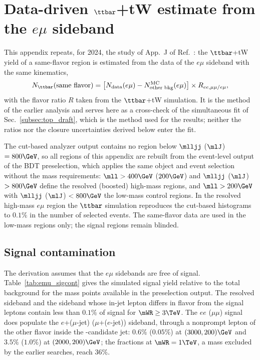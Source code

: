 \section{Data-driven \texorpdfstring{$\ttbar$+tW}{ttbar+tW} estimate from the \texorpdfstring{$e\mu$}{e-mu} sideband}
\label{app:emu_method}

This appendix repeats, for 2024, the study of App.~J of Ref.~\cite{bib:AN19083}:
the $\ttbar$+tW yield of a same-flavor region is estimated from the data of the
$e\mu$ sideband with the same kinematics,
%
\begin{equation}
  N_{\ttbar}(\text{same flavor}) =
  \bigl[N_{\text{data}}(e\mu) - N_{\text{other bkg}}^{\text{MC}}(e\mu)\bigr]
  \times R_{ee,\mu\mu/e\mu},
  \label{eq:emu_method}
\end{equation}
%
with the flavor ratio $R$ taken from the $\ttbar$+tW simulation. It is the
method of the earlier analysis and serves here as a cross-check of the
simultaneous fit of Sec.~\ref{subsec:top_draft}, which is the method used for
the results; neither the ratios nor the closure uncertainties derived below
enter the fit.

The cut-based analyzer output contains no region below $\mlljj$ ($\mlJ$)
$= 800\GeV$, so all regions of this appendix are rebuilt from the event-level
output of the BDT preselection, which applies the same object and event
selection without the mass requirements: $\mll > 400\GeV$ ($200\GeV$) and
$\mlljj$ ($\mlJ$) $> 800\GeV$ define the resolved (boosted) high-mass regions,
and $\mll > 200\GeV$ with $\mlljj$ ($\mlJ$) $< 800\GeV$ the low-mass control
regions. In the resolved high-mass $e\mu$ region the $\ttbar$ simulation
reproduces the cut-based histograms to $0.1\%$ in the number of selected
events. The same-flavor data are used in the low-mass regions only; the
signal regions remain blinded.

\subsection{Signal contamination}
The derivation assumes that the $e\mu$ sidebands are free of signal.
Table~\ref{tab:emu_sigcont} gives the simulated signal yield relative to the
total background for the mass points available in the preselection output.
The resolved sideband and the sideband whose in-jet lepton differs in flavor
from the signal leptons contain less than $0.1\%$ of signal for
$\mWR \geq 3\TeV$. The $ee$ ($\mu\mu$) signal does populate the
$e$+($\mu$-jet) ($\mu$+($e$-jet)) sideband, through a nonprompt lepton of
the other flavor inside the \N{}-candidate jet: $0.6\%$ ($0.05\%$) at
$(3000, 200)\GeV$ and $3.5\%$ ($1.0\%$) at $(2000, 200)\GeV$; the fractions
at $\mWR = 1\TeV$, a mass excluded by the earlier searches, reach $36\%$.

